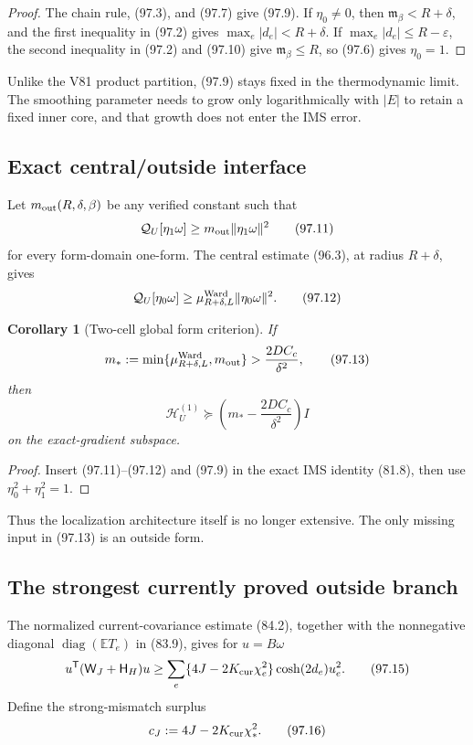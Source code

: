 \documentclass[11pt]{article}
\newtheorem{corollary}[theorem]{Corollary}
\theoremstyle{remark}
\begin{document}
\begin{proof}
The chain rule, (97.3), and (97.7) give (97.9).  If \(\eta_0\ne0\),
then \(\mathfrak m_\beta<R+\delta\), and the first inequality in
(97.2) gives \(\max_e|d_e|<R+\delta\).  If
\(\max_e|d_e|\leq R-\varepsilon\), the second inequality in (97.2)
and (97.10) give \(\mathfrak m_\beta\leq R\), so (97.6) gives
\(\eta_0=1\).
\end{proof}

Unlike the V81 product partition, (97.9) stays fixed in the
thermodynamic limit.  The smoothing parameter needs to grow only
logarithmically with \(|E|\) to retain a fixed inner core, and that
growth does not enter the IMS error.

\subsection{Exact central/outside interface}

Let \(m_{\rm out}(R,\delta,\beta)\) be any verified constant such that
\[
 \mathcal Q_U[\eta_1\omega]
 \geq m_{\rm out}\|\eta_1\omega\|^2                \tag{97.11}
\]
for every form-domain one-form.  The central estimate (96.3), at
radius \(R+\delta\), gives
\[
 \mathcal Q_U[\eta_0\omega]
 \geq\mu_{R+\delta,L}^{\rm Ward}
       \|\eta_0\omega\|^2.                          \tag{97.12}
\]

\begin{corollary}[Two-cell global form criterion]
\label{cor:v17v97-two-cell}
If
\[
 m_*:=\min\{\mu_{R+\delta,L}^{\rm Ward},m_{\rm out}\}
 >\frac{2DC_c}{\delta^2},                            \tag{97.13}
\]
then
\[
 \mathscr H_U^{(1)}
 \succeq\left(m_*-\frac{2DC_c}{\delta^2}\right)I   \tag{97.14}
\]
on the exact-gradient subspace.
\end{corollary}

\begin{proof}
Insert (97.11)--(97.12) and (97.9) in the exact IMS identity (81.8),
then use \(\eta_0^2+\eta_1^2=1\).
\end{proof}

Thus the localization architecture itself is no longer extensive.
The only missing input in (97.13) is an outside form.

\subsection{The strongest currently proved outside branch}

The normalized current-covariance estimate (84.2), together with the
nonnegative diagonal \(\operatorname{diag}(\mathbb ET_e)\) in
(83.9), gives for \(u=B\omega\)
\[
 u^{\mathsf T}(\mathsf W_J+\mathsf H_H)u
 \geq\sum_e
 \{4J-2K_{\rm cur}\chi_e^2\}
 \cosh(2d_e)u_e^2.                                  \tag{97.15}
\]
Define the strong-mismatch surplus
\[
 c_J:=4J-2K_{\rm cur}\chi_*^2.                     \tag{97.16}
\]
\end{document}
